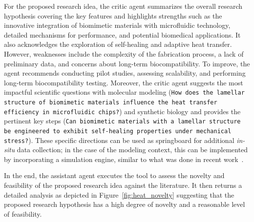 \documentclass{article}
\begin{document}
For the proposed research idea, the critic agent summarizes the overall research hypothesis covering the key features and highlights strengths such as the innovative integration of biomimetic materials with microfluidic technology, detailed mechanisms for performance, and potential biomedical applications. It also acknowledges the exploration of self-healing and adaptive heat transfer. However, weaknesses include the complexity of the fabrication process, a lack of preliminary data, and concerns about long-term biocompatibility. To improve, the agent recommends conducting pilot studies, assessing scalability, and performing long-term biocompatibility testing. Moreover, the critic agent suggests the most impactful scientific questions with molecular modeling (\texttt{How does the lamellar structure of biomimetic materials influence the heat transfer efficiency in microfluidic chips?}) and synthetic biology and provides the pertinent key steps (\texttt{Can biomimetic materials with a lamellar structure be engineered to exhibit self-healing properties under mechanical stress?}). These specific directions can be used as springboard for additional \textit{in-situ} data collection; in the case of the modeling context, this can be implemented by incorporating a simulation engine, similar to what was done in recent work~\cite{ghafarollahi2024protagents}.

In the end, the assistant agent executes the tool to assess the novelty and feasibility of the proposed research idea against the literature. It then returns a detailed analysis as depicted in Figure~\ref{fig:heat_novelty} suggesting that the proposed research hypothesis has a high degree of novelty and a reasonable level of feasibility. 
\end{document}
